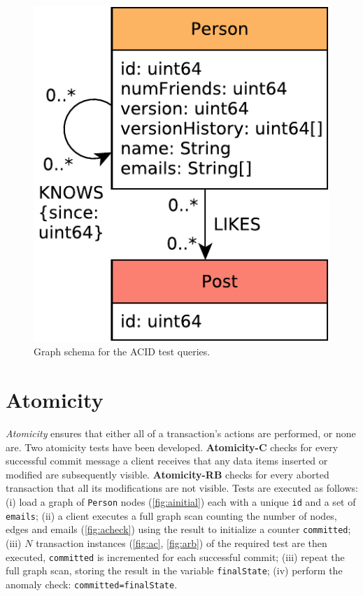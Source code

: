 \begin{figure}
  \centering
  \includegraphics[scale=\yedscale]{figures/acid/core-schema}
  \caption{Graph schema for the ACID test queries.}
  \label{fig:core-schema}
\end{figure}

\begin{figure}
  \centering
  
\end{figure}

\section{Atomicity}
\label{sec:atomicity}

\emph{Atomicity} ensures that either all of a transaction's actions are performed, or none are.
Two atomicity tests have been developed.
\textbf{Atomicity-C} checks for every successful commit message a client receives that any data items inserted or modified are subsequently visible.
\textbf{Atomicity-RB} checks for every aborted transaction that all its modifications are not visible.
%
Tests are executed as follows:
(i) load a graph of \texttt{Person} nodes (\autoref{fig:ainitial}) each with a unique \texttt{id} and a set of \texttt{emails};
(ii) a client executes a full graph scan counting the number of nodes, edges and emails (\autoref{fig:acheck}) using the result to initialize a counter \texttt{committed};
(iii) $N$ transaction instances (\autoref{fig:ac}, \autoref{fig:arb}) of the required test are then executed, \texttt{committed} is incremented for each successful commit;
(iii) repeat the full graph scan, storing the result in the variable \texttt{finalState};
(iv) perform the anomaly check: \texttt{committed=finalState}.

